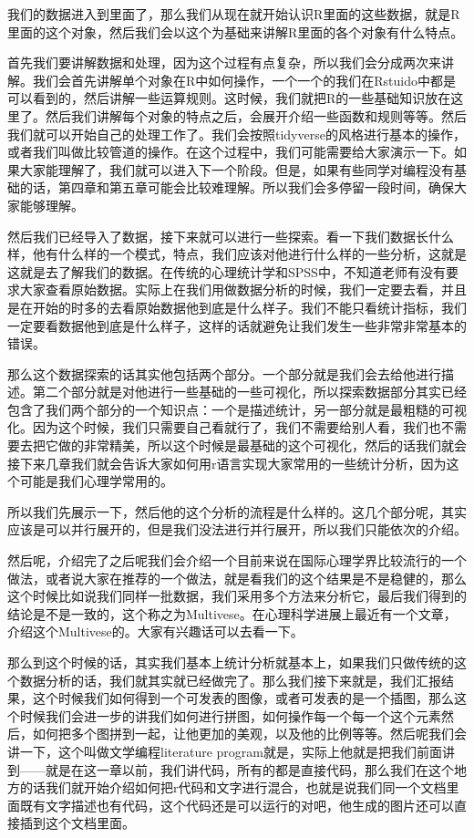 \documentclass[
  oneside]{book}
\begin{document}
我们的数据进入到里面了，那么我们从现在就开始认识R里面的这些数据，就是R里面的这个对象，然后我们会以这个为基础来讲解R里面的各个对象有什么特点。

首先我们要讲解数据和处理，因为这个过程有点复杂，所以我们会分成两次来讲解。我们会首先讲解单个对象在R中如何操作，一个一个的我们在Rstuido中都是可以看到的，然后讲解一些运算规则。这时候，我们就把R的一些基础知识放在这里了。然后我们讲解每个对象的特点之后，会展开介绍一些函数和规则等等。然后我们就可以开始自己的处理工作了。我们会按照tidyverse的风格进行基本的操作，或者我们叫做比较管道的操作。在这个过程中，我们可能需要给大家演示一下。如果大家能理解了，我们就可以进入下一个阶段。但是，如果有些同学对编程没有基础的话，第四章和第五章可能会比较难理解。所以我们会多停留一段时间，确保大家能够理解。

然后我们已经导入了数据，接下来就可以进行一些探索。看一下我们数据长什么样，他有什么样的一个模式，特点，我们应该对他进行什么样的一些分析，这就是这就是去了解我们的数据。在传统的心理统计学和SPSS中，不知道老师有没有要求大家查看原始数据。实际上在我们用做数据分析的时候，我们一定要去看，并且是在开始的时多的去看原始数据他到底是什么样子。我们不能只看统计指标，我们一定要看数据他到底是什么样子，这样的话就避免让我们发生一些非常非常基本的错误。

那么这个数据探索的话其实他包括两个部分。一个部分就是我们会去给他进行描述。第二个部分就是对他进行一些基础的一些可视化，所以探索数据部分其实已经包含了我们两个部分的一个知识点：一个是描述统计，另一部分就是最粗糙的可视化。因为这个时候，我们只需要自己看就行了，我们不需要给别人看，我们也不需要去把它做的非常精美，所以这个时候是最基础的这个可视化，然后的话我们就会接下来几章我们就会告诉大家如何用r语言实现大家常用的一些统计分析，因为这个可能是我们心理学常用的。

所以我们先展示一下，然后他的这个分析的流程是什么样的。这几个部分呢，其实应该是可以并行展开的，但是我们没法进行并行展开，所以我们只能依次的介绍。

然后呢，介绍完了之后呢我们会介绍一个目前来说在国际心理学界比较流行的一个做法，或者说大家在推荐的一个做法，就是看我们的这个结果是不是稳健的，那么这个时候比如说我们同样一批数据，我们采用多个方法来分析它，最后我们得到的结论是不是一致的，这个称之为Multivese。在心理科学进展上最近有一个文章，介绍这个Multivese的。大家有兴趣话可以去看一下。

那么到这个时候的话，其实我们基本上统计分析就基本上，如果我们只做传统的这个数据分析的话，我们就其实就已经做完了。那么我们接下来就是，我们汇报结果，这个时候我们如何得到一个可发表的图像，或者可发表的是一个插图，那么这个时候我们会进一步的讲我们如何进行拼图，如何操作每一个每一个这个元素然后，如何把多个图拼到一起，让他更加的美观，以及他的比例等等。然后呢我们会讲一下，这个叫做文学编程literature program就是，实际上他就是把我们前面讲到------就是在这一章以前，我们讲代码，所有的都是直接代码，那么我们在这个地方的话我们就开始介绍如何把r代码和文字进行混合，也就是说我们同一个文档里面既有文字描述也有代码，这个代码还是可以运行的对吧，他生成的图片还可以直接插到这个文档里面。
\end{document}
